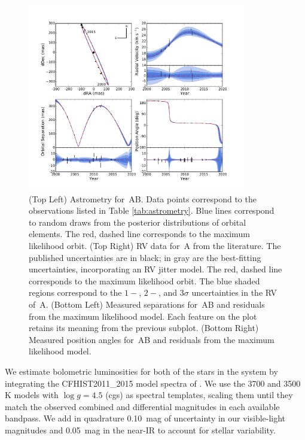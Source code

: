 \begin{figure}[htbp!]
\centerline{\includegraphics[width=0.85\textwidth]{chapter6/f1.pdf}}
\caption[Astrometry and RV data for \thisstarsix\,AB]{(Top Left) Astrometry for \thisstarsix\,AB. Data points correspond to the observations
listed in Table \ref{tab:astrometry}. Blue lines correspond to random draws from the posterior
distributions of orbital elements. The red, dashed line corresponds to the maximum likelihood
orbit. (Top Right) RV data for \thisstarsix\,A from the literature. 
The published uncertainties are in black;
in gray are the best-fitting uncertainties, incorporating an RV jitter model. The red, dashed
line corresponds to the maximum likelihood orbit. The blue shaded regions correspond
to the $1-$, $2-$, and $3\sigma$ uncertainties in the RV of \thisstarsix\,A.
(Bottom Left) Measured separations for \thisstarsix\,AB and residuals from the maximum likelihood
model. 
Each feature on the plot retains its meaning from the previous subplot.
(Bottom Right) Measured position angles for \thisstarsix\,AB and residuals from the maximum 
likelihood model.
  }
\label{fig:fits}
\end{figure}

We estimate bolometric luminosities for both of the stars in the system by integrating the CFHIST2011\_2015 model 
spectra of \citet{Baraffe15}.
We use the 3700 and 3500 K models with $\log g = 4.5$ (cgs) as spectral templates, scaling them
until they match the observed combined and differential magnitudes in each available bandpass.
We add in quadrature 0.10~mag of uncertainty in our visible-light magnitudes and 0.05~mag in 
the near-IR to account for stellar variability.

